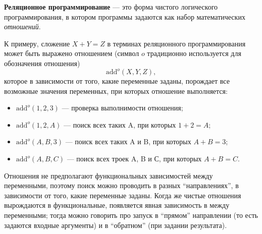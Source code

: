 {\bf Реляционное программирование} --- это форма чистого логического программирования,
в котором программы задаются как набор математических {\it отношений}.

К примеру, сложение $X + Y = Z$ в терминах реляционного программирования может
быть выражено отношением (символ $o$ традиционно используется для обозначения отношения)
\[ \text{add}^o(X, Y, Z), \]
которое в зависимости от того, какие переменные заданы, порождает
все возможные значения переменных, при которых отношение выполняется:
\begin{itemize}
\item $\text{add}^o(1, 2, 3)$ --- проверка выполнимости отношения;
\item $\text{add}^o(1, 2, A)$ --- поиск всех таких A, при которых $1 + 2 = A$;
\item $\text{add}^o(A, B, 3)$ --- поиск всех таких A и B, при которых $A + B = 3$;
\item $\text{add}^o(A, B, C)$ --- поиск всех троек A, B и С, при которых $A + B = C$.
\end{itemize}

Отношения не предполагают функциональных зависимостей между переменными, поэтому
поиск можно проводить в разных ``направлениях'', в зависимости от того, какие переменные
заданы. Когда же чистые отношения вырождаются в функциональные, появляется
явная зависимость в между переменными; тогда можно говорить про запуск
в ``прямом'' направлении (то есть задаются входные аргументы) и в ``обратном''
(при задании результата).


%
